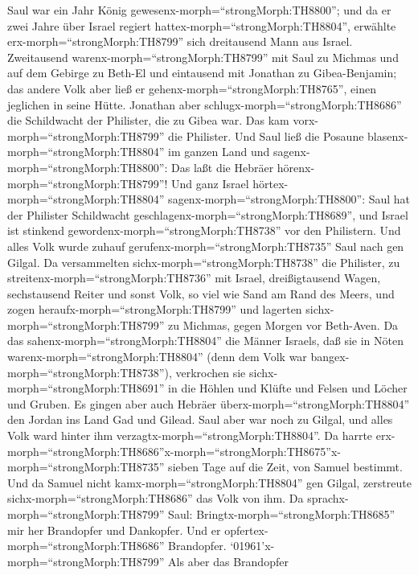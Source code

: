  Saul war ein Jahr König
gewesenx-morph=``strongMorph:TH8800''; und da er zwei Jahre über Israel
regiert hattex-morph=``strongMorph:TH8804'',  erwählte
erx-morph=``strongMorph:TH8799'' sich dreitausend Mann aus Israel.
Zweitausend warenx-morph=``strongMorph:TH8799'' mit Saul zu Michmas und
auf dem Gebirge zu Beth-El und eintausend mit Jonathan zu
Gibea-Benjamin; das andere Volk aber ließ er
gehenx-morph=``strongMorph:TH8765'', einen jeglichen in seine Hütte.
 Jonathan aber schlugx-morph=``strongMorph:TH8686'' die
Schildwacht der Philister, die zu Gibea war. Das kam
vorx-morph=``strongMorph:TH8799'' die Philister. Und Saul ließ die
Posaune blasenx-morph=``strongMorph:TH8804'' im ganzen Land und
sagenx-morph=``strongMorph:TH8800'': Das laßt die Hebräer
hörenx-morph=``strongMorph:TH8799''!  Und ganz Israel
hörtex-morph=``strongMorph:TH8804'' sagenx-morph=``strongMorph:TH8800'':
Saul hat der Philister Schildwacht
geschlagenx-morph=``strongMorph:TH8689'', und Israel ist stinkend
gewordenx-morph=``strongMorph:TH8738'' vor den Philistern. Und alles
Volk wurde zuhauf gerufenx-morph=``strongMorph:TH8735'' Saul nach gen
Gilgal.  Da versammelten sichx-morph=``strongMorph:TH8738''
die Philister, zu streitenx-morph=``strongMorph:TH8736'' mit Israel,
dreißigtausend Wagen, sechstausend Reiter und sonst Volk, so viel wie
Sand am Rand des Meers, und zogen heraufx-morph=``strongMorph:TH8799''
und lagerten sichx-morph=``strongMorph:TH8799'' zu Michmas, gegen Morgen
vor Beth-Aven.  Da das sahenx-morph=``strongMorph:TH8804''
die Männer Israels, daß sie in Nöten warenx-morph=``strongMorph:TH8804''
(denn dem Volk war bangex-morph=``strongMorph:TH8738''), verkrochen sie
sichx-morph=``strongMorph:TH8691'' in die Höhlen und Klüfte und Felsen
und Löcher und Gruben.  Es gingen aber auch Hebräer
überx-morph=``strongMorph:TH8804'' den Jordan ins Land Gad und Gilead.
Saul aber war noch zu Gilgal, und alles Volk ward hinter ihm
verzagtx-morph=``strongMorph:TH8804''.  Da harrte
erx-morph=``strongMorph:TH8686''\textbar x-morph=``strongMorph:TH8675''x-morph=``strongMorph:TH8735''
sieben Tage auf die Zeit, von Samuel bestimmt. Und da Samuel nicht
kamx-morph=``strongMorph:TH8804'' gen Gilgal, zerstreute
sichx-morph=``strongMorph:TH8686'' das Volk von ihm.  Da
sprachx-morph=``strongMorph:TH8799'' Saul:
Bringtx-morph=``strongMorph:TH8685'' mir her Brandopfer und Dankopfer.
Und er opfertex-morph=``strongMorph:TH8686'' Brandopfer. 
`01961'\textbar x-morph=``strongMorph:TH8799'' Als aber das Brandopfer
